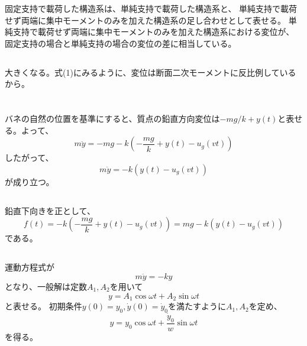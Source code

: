 \documentclass[a4paper]{jsarticle}
\begin{document}
\subsubsection{}
固定支持で載荷した構造系は、単純支持で載荷した構造系と、
単純支持で載荷せず両端に集中モーメントのみを加えた構造系の足し合わせとして表せる。
単純支持で載荷せず両端に集中モーメントのみを加えた構造系における変位が、
固定支持の場合と単純支持の場合の変位の差に相当している。

\subsection{}
大きくなる。式(1)にみるように、変位は断面二次モーメントに反比例しているから。

\section{}
\subsection{}
バネの自然の位置を基準にすると、質点の鉛直方向変位は$-m g / k + y(t)$と表せる。よって、
\begin{equation}
  m \ddot{y} = -m g - k \left(-\frac{mg}{k}+ y(t) - u_g(vt)\right)
\end{equation}
したがって、
\begin{equation}
  m \ddot{y} = -k\left(y(t) - u_g(vt)\right)
\end{equation}
が成り立つ。

\subsection{}
鉛直下向きを正として、
\begin{equation}
  f(t) = -k \left(-\frac{mg}{k} + y(t) - u_g(vt)\right)
  = mg -k \left(y(t) - u_g(vt)\right)
\end{equation}
である。

\subsection{}
運動方程式が
\begin{equation}
  m \ddot{y} = - k y
\end{equation}
となり、一般解は定数$A_1, A_2$を用いて
\begin{equation}
  y = A_1 \cos \omega t + A_2 \sin \omega t
\end{equation}
と表せる。
初期条件$y(0) = y_0, \dot{y}(0) = \dot{y}_0$を満たすように$A_1,A_2$を定め、
\begin{equation}
  y = y_0 \cos \omega t + \frac{\dot{y}_0}{w} \sin \omega t
\end{equation}
を得る。
\end{document}
